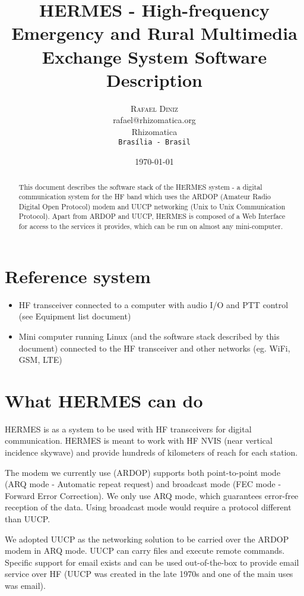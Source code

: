 \documentclass[11pt,a4paper]{article}
\title{HERMES - High-frequency Emergency and Rural Multimedia Exchange
  System Software Description}
\author{
       \large
        \textsc{Rafael Diniz}
        \mbox{}\\ %
        rafael@rhizomatica.org\\
        \mbox{Rhizomatica} \\ %
        \normalsize
        \texttt{Brasília - Brasil}\\
}
\date{\today}
\begin{document}
\maketitle

\begin{abstract}

This document describes the software stack of the HERMES
system - a digital communication system for the HF band which uses the ARDOP
(Amateur Radio Digital Open Protocol) modem and UUCP networking (Unix to Unix
Communication Protocol). Apart from ARDOP and UUCP, HERMES is composed of a
Web Interface for access to the services it provides, which can be run
on almost any mini-computer.

\end{abstract}

\newpage

\tableofcontents

\section{Reference system}

\begin{itemize}
\item HF transceiver connected to a computer with audio I/O and PTT control
  (see Equipment list document)
\item Mini computer running Linux (and the software stack described by this
  document) connected to the HF transceiver and other networks (eg. WiFi,
  GSM, LTE)
\end{itemize}

\section{What HERMES can do}

HERMES is as a system to be used with HF transceivers for digital
communication. HERMES is meant to work with HF NVIS (near vertical incidence
skywave) and provide hundreds of kilometers of reach for each station.

The modem we currently use (ARDOP) supports both point-to-point mode (ARQ
mode - Automatic repeat request) and broadcast mode (FEC mode - Forward
Error Correction). We only use ARQ mode, which guarantees error-free
reception of the data. Using broadcast mode would require a protocol
different than UUCP.

We adopted UUCP as the networking solution to be carried over the ARDOP modem in
ARQ mode. UUCP can carry files and execute remote commands. Specific support
for email exists and can be used out-of-the-box to provide email service over
HF (UUCP was created in the late 1970s and one of the main uses was email).
\end{document}
